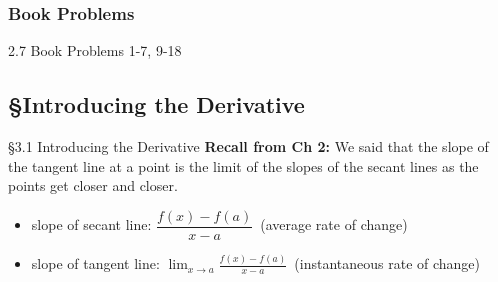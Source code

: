 \documentclass[Cal1Spr16Lectures.tex]{subfiles}
\begin{document}
\subsubsection{Book Problems}

\begin{frame}
\begin{block}{2.7 Book Problems} 1-7, 9-18 \end{block}
\end{frame}

\subsection[3.1 Introducing the Derivative]{\S Introducing the Derivative}

\begin{frame}{\S 3.1 Introducing the Derivative}{}
{\bf Recall from Ch 2:}  We said that the slope of the tangent line at a point is the limit of the slopes of the secant lines as the points get closer and closer.
\begin{itemize}
\item slope of secant line:  $\dfrac{f(x)-f(a)}{x-a}$\ (average rate of change) 
\item slope of tangent line:  $\lim_{x \to a} \frac{f(x)-f(a)}{x-a}$\ (instantaneous rate of change)
\end{itemize}
\end{frame}

\begin{frame}
\end{frame}
\end{document}
